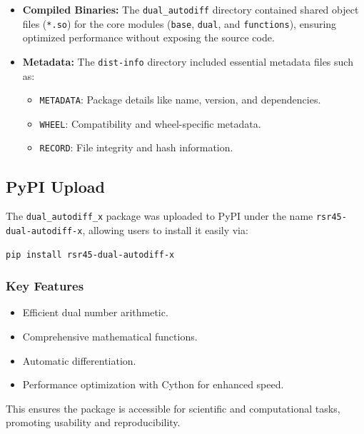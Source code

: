 \documentclass[a4paper,12pt]{article}
\begin{document}
\begin{itemize}
    \item \textbf{Compiled Binaries:} The \texttt{dual\_autodiff} directory contained shared object files (\texttt{*.so}) for the core modules (\texttt{base}, \texttt{dual}, and \texttt{functions}), ensuring optimized performance without exposing the source code.
    \item \textbf{Metadata:} The \texttt{dist-info} directory included essential metadata files such as:
    \begin{itemize}
        \item \texttt{METADATA}: Package details like name, version, and dependencies.
        \item \texttt{WHEEL}: Compatibility and wheel-specific metadata.
        \item \texttt{RECORD}: File integrity and hash information.
    \end{itemize}
\end{itemize}

\subsection{PyPI Upload}

The \texttt{dual\_autodiff\_x} package was uploaded to PyPI under the name \texttt{rsr45-dual-autodiff-x}, allowing users to install it easily via:
\begin{verbatim}
pip install rsr45-dual-autodiff-x
\end{verbatim}

\subsubsection{Key Features}
\begin{itemize}
    \item Efficient dual number arithmetic.
    \item Comprehensive mathematical functions.
    \item Automatic differentiation.
    \item Performance optimization with Cython for enhanced speed.
\end{itemize}

This ensures the package is accessible for scientific and computational tasks, promoting usability and reproducibility.





\printbibliography
\end{document}
